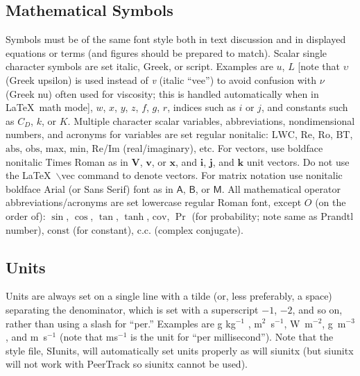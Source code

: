 \documentclass[12pt]{article}
\begin{document}
\subsection{Mathematical Symbols}
Symbols must be of the same font style both in text discussion and in displayed equations or terms (and figures should be prepared to match).  Scalar single character symbols are set italic, Greek, or script.  Examples are $u$, $L$ [note that $\upsilon$ (Greek upsilon) is used instead of \textit{v} (italic ``vee'') to avoid confusion with  $\nu$ (Greek nu) often used for viscosity; this is handled automatically when in \LaTeX\ math mode], $w$, $x$, $y$, $z$, $f$, $g$, $r$, indices such as $i$ or $j$, and constants such as $C_D$, $k$, or $K$.  Multiple character scalar variables, abbreviations, nondimensional numbers, and acronyms for variables are set regular nonitalic: $\mathrm{LWC}$, $\mathrm{Re}$, $\mathrm{Ro}$, $\mathrm{BT}$, $\mathrm{abs}$, $\mathrm{obs}$, $\mathrm{max}$, $\mathrm{min}$, $\mathrm{Re}$/$\mathrm{Im}$ (real/imaginary), etc.  For vectors, use boldface nonitalic Times Roman as in $\mathbf{V}$, $\mathbf{v}$, or $\mathbf{x}$, and $\mathbf{i}$, $\mathbf{j}$, and $\mathbf{k}$ unit vectors. Do not use the \LaTeX\ $\backslash$vec command to denote vectors.  For matrix notation use nonitalic boldface Arial (or Sans Serif) font as in $\bm{\mathsf{A}}$, $\bm{\mathsf{B}}$, or $\bm{\mathsf{M}}$.  All mathematical operator abbreviations/acronyms are set lowercase regular Roman font, except $O$ (on the order of): $\sin$, $\cos$, $\tan$, $\tanh$, $\mathrm{cov}$, $\Pr$ (for probability; note same as Prandtl number), $\mathrm{const}$ (for constant), $\mathrm{c.c.}$ (complex conjugate).

\subsection{Units}
Units are always set on a single line with a tilde (or, less preferably, a space) separating the denominator, which is set with a superscript $-1$, $-2$, and so on, rather than using a slash for ``per.''  Examples are g kg$^{-1}$ , m$^2$~s$^{-1}$, W~m$^{-2}$, g~m$^{-3}$, and m~s$^{-1}$ (note that ms$^{-1}$ is the unit for ``per millisecond'').  Note that the style file, SIunits, will automatically set units properly as will siunitx (but siunitx will not work with PeerTrack so siunitx cannot be used).
\end{document}
